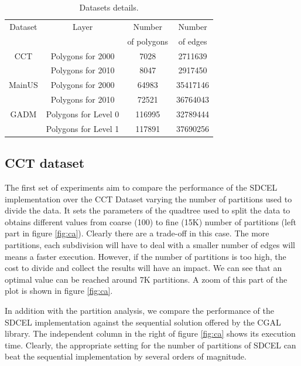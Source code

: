 \begin{table}[!ht]
    \caption{Datasets details.}
    \label{tab:datasets}
    \begin{tabular}{c c c c}
        \toprule
        Dataset & Layer & Number        & Number    \\
                &       & of polygons   & of edges  \\
        \midrule
        CCT   & Polygons for 2000 & 7028 & 2711639  \\
              & Polygons for 2010 & 8047 & 2917450 \\
        MainUS& Polygons for 2000 & 64983 & 35417146  \\
              & Polygons for 2010 & 72521 & 36764043 \\
        GADM  & Polygons for Level 0 & 116995 & 32789444 \\
              & Polygons for Level 1 & 117891 & 37690256 \\
        \bottomrule
    \end{tabular}
\end{table}

\subsection{CCT dataset}

The first set of experiments aim to compare the performance of the SDCEL implementation over the CCT Dataset varying the number of partitions used to divide the data. It sets the parameters of the quadtree used to split the data to obtains different values from coarse (100) to fine (15K) number of partitions (left part in figure \ref{fig:ca}).  Clearly there are a trade-off in this case.  The more partitions, each subdivision will have to deal with a smaller number of edges will means a faster execution.  However, if the number of partitions is too high, the cost to divide and collect the results will have an impact.  We can see that an optimal value can be reached around 7K partitions.  A zoom of this part of the plot is shown in figure \ref{fig:ca}.

In addition with the partition analysis, we compare the performance of the SDCEL implementation against the sequential solution offered by the CGAL library.  The independent column in the right of figure \ref{fig:ca} shows its execution time.  Clearly, the appropriate setting for the number of partitions of SDCEL can beat the sequential implementation by several orders of magnitude.

